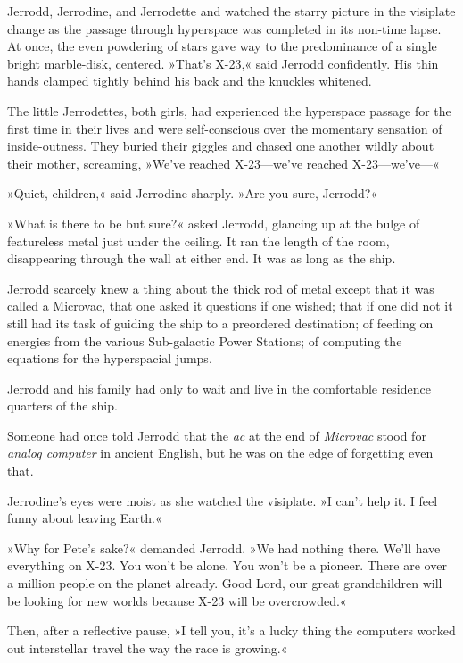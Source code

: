 \documentclass[11pt,twocolumn,paper=a5,pagesize,twoside]{article}
\newcommand{\q}[1]{»#1«}
\newcommand{\futureone}[1]{ #1 }
\newcommand{\initial}[1]{ \lettrine[lines=3,lhang=0.3,nindent=0em]{  {\textsf{#1}}}{}}
\newcommand{\initialb}[1]{ \lettrine[lines=3,lhang=0.3,nindent=1em]{  {\textsf{#1}}}{}}
\begin{document}
\futureone{
\initial{J}errodd, Jerrodine, and Jerrodette \MakeUppercase{\romannumeral 1}
and \MakeUppercase{\romannumeral 2} watched the starry picture in the 
visiplate change as the passage through hyperspace was completed in its 
non-time lapse. At once, the even powdering of stars gave way to the 
predominance of a single bright marble-disk, centered.
\q{That's X-23,} said Jerrodd confidently. His thin hands clamped tightly 
behind his back and the knuckles whitened.

The little Jerrodettes, both girls, had experienced the hyperspace passage 
for the first time in their lives and were self-conscious over the momentary 
sensation of inside-outness. They buried their giggles and chased one another 
wildly about their mother, screaming, \q{We've reached X-23---we've reached 
X-23---we've---}

\q{Quiet, children,} said Jerrodine sharply. \q{Are you sure, Jerrodd?}

\q{What is there to be but sure?} asked Jerrodd, glancing up at the bulge 
of featureless metal just under the ceiling. It ran the length of the room, 
disappearing through the wall at either end. It was as long as the ship.

Jerrodd scarcely knew a thing about the thick rod of metal except that it 
was called a Microvac, that one asked it questions if one wished; that if 
one did not it still had its task of guiding the ship to a preordered 
destination; of feeding on energies from the various Sub-galactic Power 
Stations; of computing the equations for the hyperspacial jumps.

Jerrodd and his family had only to wait and live in the comfortable residence 
quarters of the ship.

Someone had once told Jerrodd that the \textit{ac} at the end of 
\textit{Microvac} stood for \textit{analog computer} in ancient English, but 
he was on the edge of forgetting even that.

Jerrodine's eyes were moist as she watched the visiplate. \q{I can't help it. 
I feel funny about leaving Earth.}

\q{Why for Pete's sake?} demanded Jerrodd. \q{We had nothing there. We'll 
have everything on X-23. You won't be alone. You won't be a pioneer. There 
are over a million people on the planet already. Good Lord, our great 
grandchildren will be looking for new worlds because X-23 will be overcrowded.}

Then, after a reflective pause, \q{I tell you, it's a lucky thing the 
computers worked out interstellar travel the way the race is growing.}

}
\end{document}
